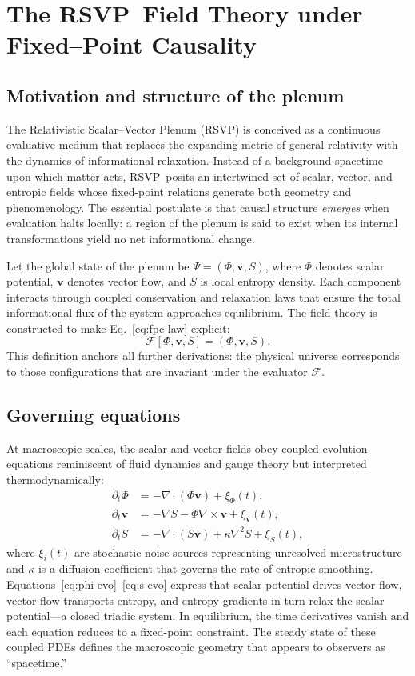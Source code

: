 \documentclass[12pt,a4paper]{article}
\newcommand{\Ph}{\Phi}                %
\newcommand{\Vv}{\mathbf{v}}          %
\newcommand{\Ss}{S}                   %
\newcommand{\RSVP}{RSVP}              %
\newcommand{\divv}{\nabla\!\cdot\!}   %
\newcommand{\grad}{\nabla}            %
\newcommand{\State}{\Psi}             %
\newcommand{\F}{\mathcal{F}}          %
\theoremstyle{plain}
\begin{document}
\section{The \RSVP\ Field Theory under Fixed--Point Causality}
\label{sec:rsvp-field}

\subsection{Motivation and structure of the plenum}
The Relativistic Scalar--Vector Plenum (\RSVP) is conceived as a continuous evaluative medium that replaces the expanding metric of general relativity with the dynamics of informational relaxation.
Instead of a background spacetime upon which matter acts, \RSVP\ posits an intertwined set of scalar, vector, and entropic fields whose fixed-point relations generate both geometry and phenomenology.
The essential postulate is that causal structure \emph{emerges} when evaluation halts locally:
a region of the plenum is said to exist when its internal transformations yield no net informational change.

Let the global state of the plenum be
\(\State = (\Ph,\Vv,\Ss)\),
where \(\Ph\) denotes scalar potential, \(\Vv\) denotes vector flow, and \(\Ss\) is local entropy density.
Each component interacts through coupled conservation and relaxation laws that ensure the total informational flux of the system approaches equilibrium.
The field theory is constructed to make Eq.~\eqref{eq:fpc-law} explicit:
\[
\F[\Ph,\Vv,\Ss] = (\Ph,\Vv,\Ss).
\]
This definition anchors all further derivations: the physical universe corresponds to those configurations that are invariant under the evaluator \(\F\).

\subsection{Governing equations}
At macroscopic scales, the scalar and vector fields obey coupled evolution equations reminiscent of fluid dynamics and gauge theory but interpreted thermodynamically:
\begin{align}
\partial_t \Ph &= -\grad\!\cdot(\Ph \Vv) + \xi_\Ph(t), \label{eq:phi-evo}\\
\partial_t \Vv &= -\grad \Ss - \Ph \grad\!\times\!\Vv + \xi_\Vv(t), \label{eq:v-evo}\\
\partial_t \Ss &= -\divv(\Ss\Vv) + \kappa \nabla^2 \Ss + \xi_\Ss(t), \label{eq:s-evo}
\end{align}
where \(\xi_i(t)\) are stochastic noise sources representing unresolved microstructure and \(\kappa\) is a diffusion coefficient that governs the rate of entropic smoothing.
Equations~\eqref{eq:phi-evo}--\eqref{eq:s-evo} express that scalar potential drives vector flow, vector flow transports entropy, and entropy gradients in turn relax the scalar potential---a closed triadic system.
In equilibrium, the time derivatives vanish and each equation reduces to a fixed-point constraint.
The steady state of these coupled PDEs defines the macroscopic geometry that appears to observers as “spacetime.”
\end{document}
